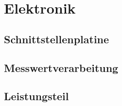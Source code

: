 \section{Elektronik}

\subsection{Schnittstellenplatine}

\subsection{Messwertverarbeitung}

\subsection{Leistungsteil}
